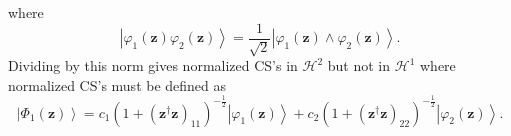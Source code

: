 \documentclass[aps,preprint]{revtex4}%
\begin{document}
where
\begin{equation}
\left\vert \varphi_{1}\left(  \mathbf{z}\right)  \varphi_{2}\left(
\mathbf{z}\right)  \right\rangle =\frac{1}{\sqrt{2}}\left\vert \varphi
_{1}\left(  \mathbf{z}\right)  \wedge\varphi_{2}\left(  \mathbf{z}\right)
\right\rangle .
\end{equation}
Dividing by this norm gives normalized CS's in $\mathcal{H}^{2}$ but not in
$\mathcal{H}^{1}$ where normalized CS's must be defined as
\begin{equation}
\left\vert \Phi_{1}\left(  \mathbf{z}\right)  \right\rangle =c_{1}\left(
1+\left(  \mathbf{z}^{\dagger}\mathbf{z}\right)  _{11}\right)  ^{-\frac{1}{2}%
}\left\vert \varphi_{1}\left(  \mathbf{z}\right)  \right\rangle +c_{2}\left(
1+\left(  \mathbf{z}^{\dagger}\mathbf{z}\right)  _{22}\right)  ^{-\frac{1}{2}%
}\left\vert \varphi_{2}\left(  \mathbf{z}\right)  \right\rangle .
\end{equation}
\end{document}
